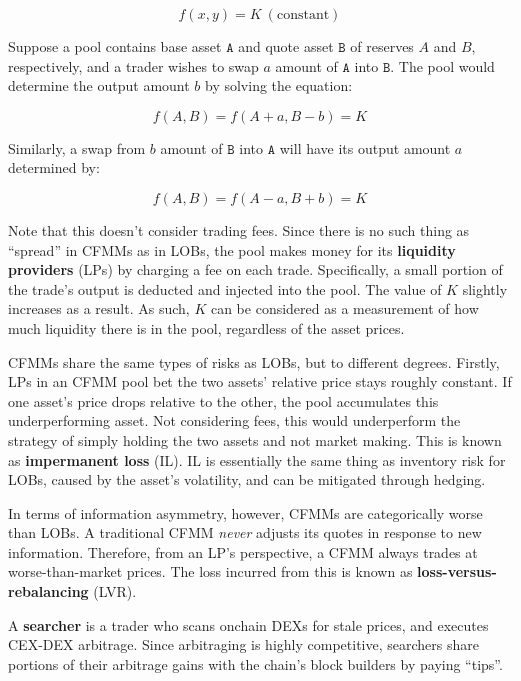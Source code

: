 \documentclass{article}
\begin{document}
\begin{equation}
  f(x, y) = K \ (\mathrm{constant})
\end{equation}

Suppose a pool contains base asset $\mathtt{A}$ and quote asset $\mathtt{B}$ of reserves $A$ and $B$, respectively, and a trader wishes to swap $a$ amount of $\mathtt{A}$ into $\mathtt{B}$. The pool would determine the output amount $b$ by solving the equation:

\begin{equation}
  f(A, B) = f(A + a, B - b) = K
\end{equation}

Similarly, a swap from $b$ amount of $\mathtt{B}$ into $\mathtt{A}$ will have its output amount $a$ determined by:

\begin{equation}
  f(A, B) = f(A - a, B + b) = K
\end{equation}

Note that this doesn't consider trading fees. Since there is no such thing as ``spread'' in CFMMs as in LOBs, the pool makes money for its \textbf{liquidity providers} (LPs) by charging a fee on each trade. Specifically, a small portion of the trade's output is deducted and injected into the pool. The value of $K$ slightly increases as a result. As such, $K$ can be considered as a measurement of how much liquidity there is in the pool, regardless of the asset prices.

CFMMs share the same types of risks as LOBs, but to different degrees. Firstly, LPs in an CFMM pool bet the two assets' relative price stays roughly constant. If one asset's price drops relative to the other, the pool accumulates this underperforming asset. Not considering fees, this would underperform the strategy of simply holding the two assets and not market making. This is known as \textbf{impermanent loss} (IL). IL is essentially the same thing as inventory risk for LOBs, caused by the asset's volatility, and can be mitigated through hedging.

In terms of information asymmetry, however,  CFMMs are categorically worse than LOBs. A traditional CFMM \textit{never} adjusts its quotes in response to new information. Therefore, from an LP's perspective, a CFMM always trades at worse-than-market prices. The loss incurred from this is known as \textbf{loss-versus-rebalancing} (LVR).\supercite{lvr}

A \textbf{searcher} is a trader who scans onchain DEXs for stale prices, and executes CEX-DEX arbitrage. Since arbitraging is highly competitive, searchers share portions of their arbitrage gains with the chain's block builders by paying ``tips''.
\end{document}

